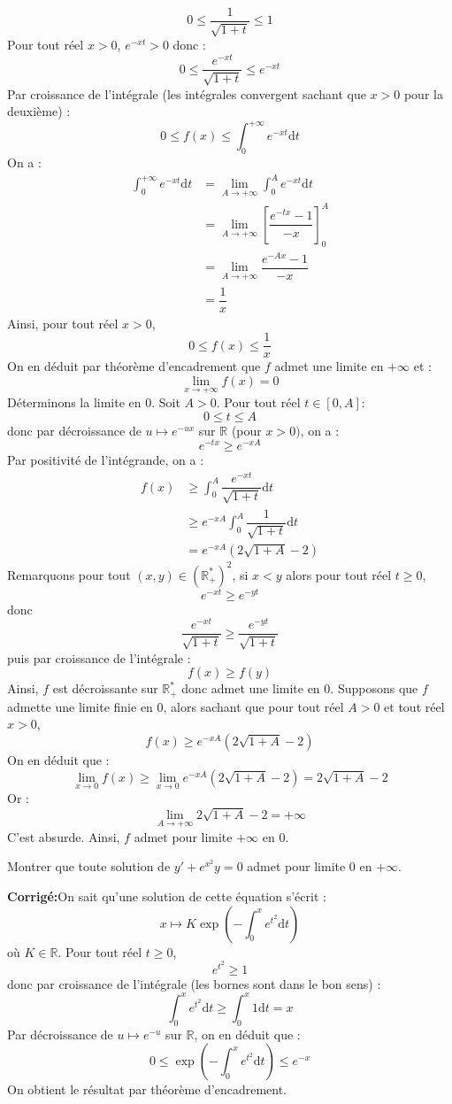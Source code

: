 \documentclass[a4paper,twoside,french,11pt]{VcCours}
\newcommand{\dt}{\text{d}t}
\newcommand{\corr}{\textbf{Corrigé:}}
\begin{document}
\begin{enumerate}
$$ 0 \leq \dfrac{1}{\sqrt{1+t}} \leq 1$$
Pour tout réel $x>0$, $e^{-xt} > 0$ donc :
$$  0 \leq \dfrac{e^{-xt}}{\sqrt{1+t}} \leq e^{-xt}$$
Par croissance de l'intégrale (les intégrales convergent sachant que $x>0$ pour la deuxième) :
$$ 0 \leq f(x) \leq \int_0^{+ \infty} e^{-xt} \dt$$
On a :
\begin{align*}
\int_0^{+ \infty} e^{-xt} \dt & =\lim_{A \rightarrow + \infty} \int_0^{A} e^{-xt} \dt \\
& = \lim_{A \rightarrow + \infty} \left[ \dfrac{e^{-tx}-1}{-x} \right]_0^A \\
&  = \lim_{A \rightarrow + \infty} \dfrac{e^{-Ax}-1}{-x} \\
& = \dfrac{1}{x}
\end{align*}
Ainsi, pour tout réel $x>0$,
$$ 0 \leq f(x) \leq \dfrac{1}{x}$$
On en déduit par théorème d'encadrement que $f$ admet une limite en $+ \infty$ et :
$$ \lim_{x \rightarrow + \infty} f(x) = 0$$
Déterminons la limite en $0$. Soit $A >0$. Pour tout réel $t \in [0,A]$:
$$ 0 \leq t \leq A$$
donc par décroissance de $u \mapsto e^{-ux}$ sur $\mathbb{R}$ (pour $x>0)$, on a :
$$  e^{-tx} \geq  e^{-xA}$$
Par positivité de l'intégrande, on a :
\begin{align*}
 f(x) & \geq \int_0^{A} \dfrac{e^{-xt}}{\sqrt{1+t}}  \dt  \\
 & \geq e^{-xA} \int_0^A \dfrac{1}{\sqrt{1+t}}  \dt  \\ 
 & = e^{-xA} (2 \sqrt{1+A}-2) 
\end{align*}
Remarquons pour tout $(x,y) \in (\mathbb{R}_+^*)^2$, si $x<y$ alors pour tout réel $t \geq 0$,
$$ e^{-xt} \geq e^{-yt}$$
donc 
$$ \dfrac{e^{-xt}}{\sqrt{1+t}} \geq \dfrac{e^{-yt}}{\sqrt{1+t}}$$
puis par croissance de l'intégrale :
$$ f(x) \geq f(y)$$
Ainsi, $f$ est décroissante sur $\mathbb{R}_+^*$ donc admet une limite en $0$. Supposons que $f$ admette une limite finie en $0$, alors sachant que pour tout réel $A>0$ et tout réel $x>0$,
$$ f(x) \geq  e^{-xA} (2 \sqrt{1+A}-2) $$
On en déduit que :
$$ \lim_{x \rightarrow 0} f(x) \geq \lim_{x \rightarrow 0} e^{-xA} (2 \sqrt{1+A}-2) = 2 \sqrt{1+A}-2$$
Or :
$$ \lim_{A \rightarrow + \infty} 2 \sqrt{1+A}-2 = + \infty$$
C'est absurde. Ainsi, $f$ admet pour limite $+ \infty$ en $0$.
\end{enumerate}

\begin{Exercice}{} Montrer que toute solution de $y'+ e^{x^2} y=0$ admet pour limite $0$ en $+ \infty$.
\end{Exercice}

\corr On sait qu'une solution de cette équation s'écrit :
$$x \mapsto K \exp \left( - \int_0^x e^{t^2} \dt \right)$$
où $K \in \mathbb{R}$. Pour tout réel $t \geq 0$,
$$ e^{t^2} \geq 1$$
donc par croissance de l'intégrale (les bornes sont dans le bon sens) :
$$ \int_0^x e^{t^2} \dt \geq \int_0^x 1 \dt = x$$
Par décroissance de $u \mapsto e^{-u}$ sur $\mathbb{R}$, on en déduit que :
$$  0 \leq \exp \left( - \int_0^x e^{t^2} \dt \right) \leq e^{-x}$$
On obtient le résultat par théorème d'encadrement.
\end{document}
